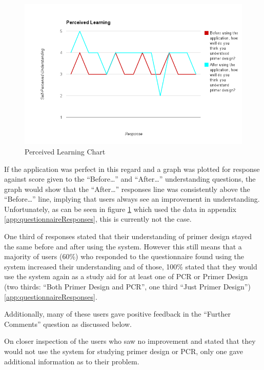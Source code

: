 \begin{figure}[!t]
  \begin{center}
    \includegraphics[width=\textwidth]{./images/perceivedLearning.png}
    \caption{Perceived Learning Chart}
    \label{fig:feedbackAnalysis:perceivedLearning}
  \end{center}
\end{figure}

If the application was perfect in this regard and a graph was plotted
for response against score given to the ``Before\ldots'' and ``After\ldots''
understanding questions, the graph would show that the ``After\ldots''
responses line was consistently above the ``Before\ldots'' line, implying
that users always see an improvement in understanding.
Unfortunately, as can be seen in figure
\ref{fig:feedbackAnalysis:perceivedLearning} which used the data in
appendix \ref{app:questionnaireResponses}, this is currently not the
case.

One third of responses stated that their understanding of primer
design stayed the same before and after using the system.
However this still means that a majority of users (60\%) who responded
to the questionnaire found using the system increased their
understanding and of those, 100\% stated that they would use the
system again as a study aid for at least one of PCR or Primer Design
(two thirds: ``Both Primer Design and PCR'', one third ``Just Primer
Design'')\ref{app:questionnaireResponses}.

Additionally, many of these users gave positive feedback in the
``Further Comments'' question as discussed below.

On closer inspection of the users who saw no improvement and stated
that they would not use the system for studying primer design or PCR,
only one gave additional information as to their problem.

